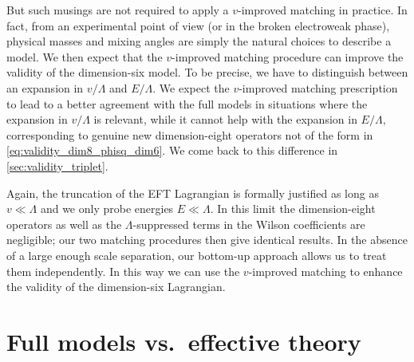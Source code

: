 \newparagraph
%
But such musings are not required to apply a $v$-improved matching in
practice. In fact, from an experimental point of view (or in the
broken electroweak phase), physical masses and mixing angles are
simply the natural choices to describe a model. We then expect that
the $v$-improved matching procedure can improve the validity of the
dimension-six model. To be precise, we have to distinguish between an
expansion in $v/\Lambda$ and $E/\Lambda$. We expect the $v$-improved
matching prescription to lead to a better agreement with the full
models in situations where the expansion in $v/\Lambda$ is relevant,
while it cannot help with the expansion in $E/\Lambda$, corresponding
to genuine new dimension-eight operators not of the form in
\autoref{eq:validity_dim8_phisq_dim6}. We come back to this difference
in \autoref{sec:validity_triplet}.

Again, the truncation of the EFT Lagrangian is formally justified as
long as $v \ll \Lambda$ and we only probe energies $E \ll \Lambda$.
In this limit the dimension-eight operators as well as the
$\Lambda$-suppressed terms in the Wilson coefficients are negligible;
our two matching procedures then give identical results. In the
absence of a large enough scale separation, our bottom-up approach
allows us to treat them independently. In this way we can use the
$v$-improved matching to enhance the validity of the dimension-six
Lagrangian.




\section{Full models vs.\ effective theory}
\label{sec:validity_full_vs_effective}

